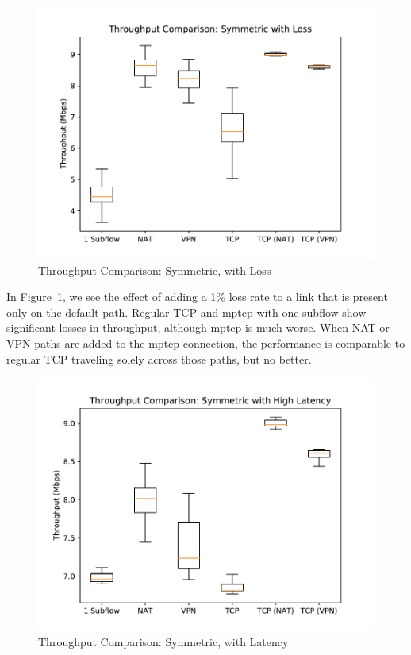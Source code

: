 \documentclass{cwru}
\begin{document}
\begin{figure}
  \centering
  \includegraphics[height=0.45\textheight]{figures/sym-lossy.pdf}
  \caption{Throughput Comparison: Symmetric, with Loss}
  \label{fig:sym_lossy}
\end{figure}

In Figure~\ref{fig:sym_lossy}, we see the effect of adding a 1\% loss rate to
a link that is present only on the default path. Regular TCP and \ac{mptcp} with
one subflow show significant losses in throughput, although \ac{mptcp} is much
worse. When NAT or VPN paths are added to the \ac{mptcp} connection, the
performance is comparable to regular TCP traveling solely across those paths,
but no better.

\begin{figure}[p]
  \centering
  \includegraphics[height=0.42\textheight]{figures/sym-delayed.pdf}
  \caption{Throughput Comparison: Symmetric, with Latency}
  \label{fig:sym_delayed}
\end{figure}
\end{document}
